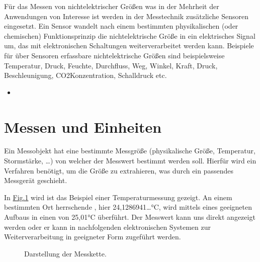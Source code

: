 \documentclass[letterpaper,10pt,english]{jupyterBook}
\let\sphinxpxdimen\pdfpxdimen\else\newdimen\sphinxpxdimen
\begin{document}
\sphinxAtStartPar
Für das Messen von nicht\sphinxhyphen{}elektrischer Größen \sphinxhyphen{} was in der Mehrheit der Anwendungen von Interesse ist \sphinxhyphen{} werden in der Messtechnik zusätzliche Sensoren eingesetzt.
Ein Sensor wandelt nach einem bestimmten physikalischen (oder chemischen) Funktionsprinzip die nicht\sphinxhyphen{}elektrische Größe in ein elektrisches Signal um, das mit elektronischen Schaltungen weiterverarbeitet werden kann. Beispiele für über Sensoren erfassbare nicht\sphinxhyphen{}elektrische Größen sind beispielsweise Temperatur, Druck, Feuchte, Durchfluss, Weg, Winkel, Kraft, Druck, Beschleunigung, CO2\sphinxhyphen{}Konzentration, Schalldruck etc.
\begin{itemize}
\item {} 
\sphinxAtStartPar
{\hyperref[\detokenize{content/1_Messen_Einheit::doc}]{}}

\end{itemize}

\sphinxstepscope


\section{Messen und Einheiten}
\label{\detokenize{content/1_Messen_Einheit:messen-und-einheiten}}\label{\detokenize{content/1_Messen_Einheit::doc}}
\sphinxAtStartPar
Ein Messobjekt hat eine bestimmte Messgröße (physikalische Größe, Temperatur, Stormstärke, …) von welcher der Messwert bestimmt werden soll. Hierfür wird ein Verfahren benötigt, um die Größe zu extrahieren, was durch ein passendes Messgerät geschieht.

\sphinxAtStartPar
In \hyperref[\detokenize{content/1_Messen_Einheit:messgroesse}]{Fig.\@ \ref{\detokenize{content/1_Messen_Einheit:messgroesse}}} wird ist das Beispiel einer Temperaturmessung gezeigt. An einem bestimmten Ort herrschende , hier 24,1286941…°C, wird mittels eines geeigneten Aufbaus in einen  von 25,01°C überführt.
Der Messwert kann uns direkt angezeigt werden oder er kann in nachfolgenden elektronischen Systemen zur Weiterverarbeitung in geeigneter Form zugeführt werden.

\begin{figure}[htbp]
\centering
\capstart

\noindent\sphinxincludegraphics[width=600\sphinxpxdimen]{{messgroesse}.jpg}
\caption{Darstellung der Messkette.}\label{\detokenize{content/1_Messen_Einheit:messgroesse}}\end{figure}
\end{document}
